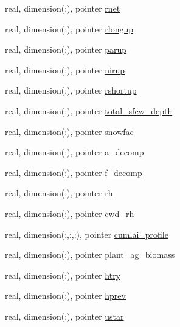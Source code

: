 \begin{DoxyCompactItemize}
\item 
real, dimension(\+:), pointer \hyperlink{structed__state__vars_1_1sitetype_af31c936c72ff1f530d3acfbe8dc731a4}{rnet}
\item 
real, dimension(\+:), pointer \hyperlink{structed__state__vars_1_1sitetype_afb8b825e1b525cf59e6509aa41d92838}{rlongup}
\item 
real, dimension(\+:), pointer \hyperlink{structed__state__vars_1_1sitetype_ace7651fbb96da7fc950264c95ce7e267}{parup}
\item 
real, dimension(\+:), pointer \hyperlink{structed__state__vars_1_1sitetype_a214f7e2691c21fff0459d5293229cdd9}{nirup}
\item 
real, dimension(\+:), pointer \hyperlink{structed__state__vars_1_1sitetype_acdd2f415004acae5f242c785a89d01e8}{rshortup}
\item 
real, dimension(\+:), pointer \hyperlink{structed__state__vars_1_1sitetype_a9b7b988a4ee2b6befe4d8982192e3406}{total\+\_\+sfcw\+\_\+depth}
\item 
real, dimension(\+:), pointer \hyperlink{structed__state__vars_1_1sitetype_aa1e990b84dfe908c98b9ef9efa0adfc7}{snowfac}
\item 
real, dimension(\+:), pointer \hyperlink{structed__state__vars_1_1sitetype_abf769bdda3d37bad1e3423df185e2c55}{a\+\_\+decomp}
\item 
real, dimension(\+:), pointer \hyperlink{structed__state__vars_1_1sitetype_a78749aaa1a2ceb85f15114fbaa085427}{f\+\_\+decomp}
\item 
real, dimension(\+:), pointer \hyperlink{structed__state__vars_1_1sitetype_a2f4e690407527dfe3d1b33f07b77219c}{rh}
\item 
real, dimension(\+:), pointer \hyperlink{structed__state__vars_1_1sitetype_afab0f8a63deb2b5be089b6708aaa946b}{cwd\+\_\+rh}
\item 
real, dimension(\+:,\+:,\+:), pointer \hyperlink{structed__state__vars_1_1sitetype_aefc82515c0a1f5b524483c98db6690c2}{cumlai\+\_\+profile}
\item 
real, dimension(\+:), pointer \hyperlink{structed__state__vars_1_1sitetype_a838fee64ddbed7b68cbe9f61612156d2}{plant\+\_\+ag\+\_\+biomass}
\item 
real, dimension(\+:), pointer \hyperlink{structed__state__vars_1_1sitetype_aca9a4fa470c2074a56bb92aae6626cd2}{htry}
\item 
real, dimension(\+:), pointer \hyperlink{structed__state__vars_1_1sitetype_af58967da464a2b990a6777477c23bb82}{hprev}
\item 
real, dimension(\+:), pointer \hyperlink{structed__state__vars_1_1sitetype_a0c0d2d0d092f53781cd5d016ba86bf6c}{ustar}

\end{DoxyCompactItemize}
